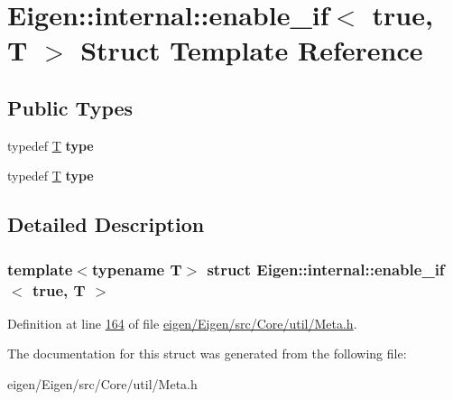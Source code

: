 \hypertarget{struct_eigen_1_1internal_1_1enable__if_3_01true_00_01_t_01_4}{}\section{Eigen\+:\+:internal\+:\+:enable\+\_\+if$<$ true, T $>$ Struct Template Reference}
\label{struct_eigen_1_1internal_1_1enable__if_3_01true_00_01_t_01_4}
\subsection*{Public Types}
\begin{DoxyCompactItemize}
\item 
\mbox{\label{struct_eigen_1_1internal_1_1enable__if_3_01true_00_01_t_01_4_aa36ae7c40deeb800cb3580c221870742}} 
typedef \hyperlink{group___sparse_core___module}{T} {\bfseries type}
\item 
\mbox{\label{struct_eigen_1_1internal_1_1enable__if_3_01true_00_01_t_01_4_aa36ae7c40deeb800cb3580c221870742}} 
typedef \hyperlink{group___sparse_core___module}{T} {\bfseries type}
\end{DoxyCompactItemize}


\subsection{Detailed Description}
\subsubsection*{template$<$typename T$>$\newline
struct Eigen\+::internal\+::enable\+\_\+if$<$ true, T $>$}



Definition at line \hyperlink{eigen_2_eigen_2src_2_core_2util_2_meta_8h_source_l00164}{164} of file \hyperlink{eigen_2_eigen_2src_2_core_2util_2_meta_8h_source}{eigen/\+Eigen/src/\+Core/util/\+Meta.\+h}.



The documentation for this struct was generated from the following file\+:\begin{DoxyCompactItemize}
\item 
eigen/\+Eigen/src/\+Core/util/\+Meta.\+h\end{DoxyCompactItemize}
